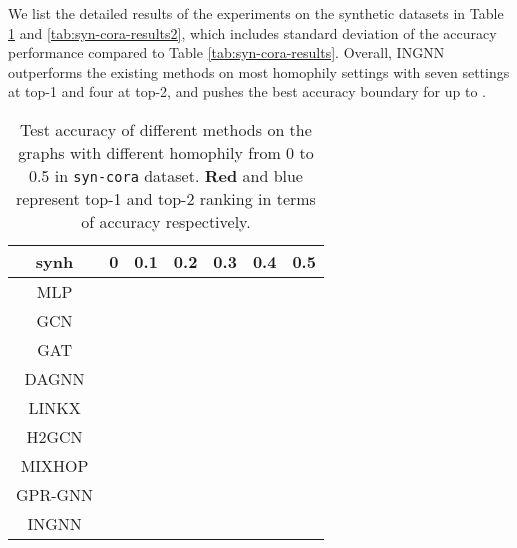 \documentclass{article}
\theoremstyle{plain}
\newcommand{\pjn}{{INGNN}}
\begin{document}
We list the detailed results of the experiments on the synthetic datasets in Table \ref{tab:syn-cora-results1} and \ref{tab:syn-cora-results2}, which includes standard deviation of the accuracy performance compared to Table \ref{tab:syn-cora-results}. Overall, \pjn{} outperforms the existing methods on most homophily settings with seven settings at top-1 and four at top-2, and pushes the best accuracy boundary for up to .

\begin{table}[ht]
\centering
\caption{Test accuracy of different methods on the graphs with different homophily from 0 to 0.5 in \texttt{syn-cora} dataset. {\color{red} \textbf{Red}} and {\color{blue} blue} represent top-1 and top-2 ranking in terms of accuracy respectively.}
\label{tab:syn-cora-results1}
\vskip 0.1in
\small
\tabcolsep=0.1cm
\begin{tabular}{c|cccccc}
\toprule
synh   & 0                                                                                       & 0.1                                                                                     & 0.2                                                                                     & 0.3                                                                                     & 0.4                                                                                     & 0.5                                                                                                                                                                           \\
\midrule
\midrule
MLP	& 	  & 	 & 	 & 	 & 	  & 		 \\
GCN	& 	 & 	 & 	 & 	 & 	  & 	 	 \\
GAT	& 	 & 	 & 	 & 	 & 	 & 	  \\
DAGNN  & 	 & 	 & 	 & 	 & 	 & 	  \\
LINKX  & 	 & 	 & 	 & 	 & 	 & 	 	 \\
H2GCN  & {\color[HTML]{FF0000} } & {\color[HTML]{FF0000} } & {\color[HTML]{0000FF} }	  & {\color[HTML]{0000FF} }	  & {\color[HTML]{0000FF} }	& {\color[HTML]{0000FF} } 	 \\
MIXHOP & 	 & 	 & 	 & 	 & 	 & 	  \\
GPR-GNN & 	 & 	 & 	 & 	 & 	 & 	  \\
\pjn{}   & {\color[HTML]{0000FF} }	  & {\color[HTML]{0000FF} }	  & {\color[HTML]{FF0000} } & {\color[HTML]{FF0000} } & {\color[HTML]{FF0000} } & {\color[HTML]{FF0000} } 	 \\
\bottomrule
\end{tabular}
\end{table}
\end{document}
